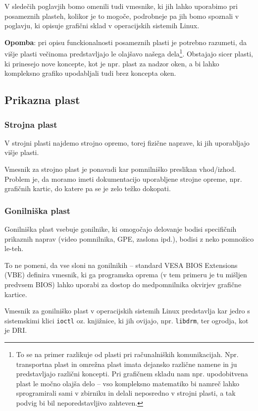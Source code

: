 \documentclass{article}
\begin{document}
V sledečih poglavjih bomo omenili tudi vmesnike, ki jih lahko uporabimo pri posameznih plasteh, kolikor je to mogoče, podrobneje pa jih bomo spoznali v poglavju, ki opisuje grafični sklad v operacijskih sistemih Linux.

\textbf{Opomba}: pri opisu funckionalnosti posameznih plasti je potrebno razumeti, da višje plasti večinoma predstavljajo le olajšavo našega dela\footnote{To se na primer razlikuje od plasti pri računalniških komunikacijah. Npr. transportna plast in omrežna plast imata dejansko različne namene in ju predstavljajo različni koncepti. Pri grafičnem skladu nam npr. upodobitvena plast le močno olajša delo -- vso kompleksno matematiko bi namreč lahko sprogramirali sami v zbirniku in delali neposredno v strojni plasti, a tak podvig bi bil neporedstavljivo zahteven.}. Obstajajo sicer plasti, ki prinesejo nove koncepte, kot je npr. plast za nadzor oken, a bi lahko kompleksno grafiko upodabljali tudi brez koncepta oken.

\subsection{Prikazna plast}
\subsubsection{Strojna plast}
V strojni plasti najdemo strojno opremo, torej fizične naprave, ki jih uporabljajo višje plasti.

Vmesnik za strojno plast je ponavadi kar pomnilniško preslikan vhod/izhod. Problem je, da moramo imeti dokumentacijo uporabljene strojne opreme, npr. grafičnih kartic, do katere pa se je zelo težko dokopati.

\subsubsection{Gonilniška plast}
Gonilniška plast vsebuje gonilnike, ki omogočajo delovanje bodisi specifičnih prikaznih naprav (video pomnilnika, GPE, zaslona ipd.), bodisi z neko pomnožico le-teh.

To ne pomeni, da vse sloni na gonilnikih -- standard VESA BIOS Extensions (VBE) definira vmesnik, ki ga programska oprema (v tem primeru je tu mišljen predvsem BIOS) lahko uporabi za dostop do medpomnilnika okvirjev grafične kartice.

Vmesnik za gonilniško plast v operacijskih sistemih Linux predstavlja kar jedro s sistemskimi klici \texttt{ioctl} oz. knjižnice, ki jih ovijajo, npr. \texttt{libdrm}, ter ogrodja, kot je DRI.
\end{document}
